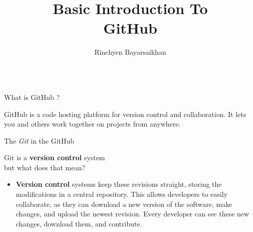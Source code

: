 \documentclass{beamer}
\author[bayarsaikhan@student.agh.edu.pl]{Rinchyen Bayarsaikhan}
\title{Basic Introduction To\\GitHub}
\begin{document}
\begin{frame}[fragile]
\begin{columns}[T]

\begin{column}{.33\textwidth}

\begin{block}{What is GitHub ?}
\item GitHub is a code hosting platform for version control and collaboration. It lets you and others work together on projects from anywhere.
\end{block}

\begin{block}{The \emph{Git} in the GitHub}
\item Git is a \textbf{version control} system \\ but what does that mean? 
\begin{itemize}
\item \textbf{Version control} systems keep these revisions straight, storing the modifications in a central repository. This allows developers to easily collaborate, as they can download a new version of the software, make changes, and upload the newest revision. Every developer can see these new changes, download them, and contribute.
\end{itemize}
\end{block}


\end{column}
\end{columns}
\end{frame}
\end{document}
